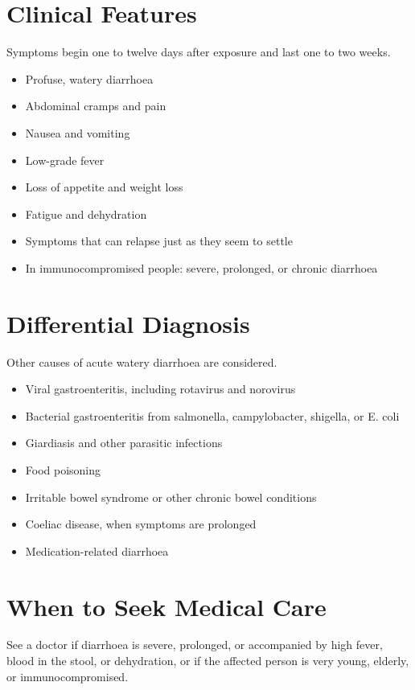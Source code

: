 \section*{Clinical Features}
Symptoms begin one to twelve days after exposure and last one to two weeks.

\begin{itemize}
    \item Profuse, watery diarrhoea
    \item Abdominal cramps and pain
    \item Nausea and vomiting
    \item Low-grade fever
    \item Loss of appetite and weight loss
    \item Fatigue and dehydration
    \item Symptoms that can relapse just as they seem to settle
    \item In immunocompromised people: severe, prolonged, or chronic diarrhoea
\end{itemize}

\section*{Differential Diagnosis}
Other causes of acute watery diarrhoea are considered.

\begin{itemize}
    \item Viral gastroenteritis, including rotavirus and norovirus
    \item Bacterial gastroenteritis from salmonella, campylobacter, shigella, or E. coli
    \item Giardiasis and other parasitic infections
    \item Food poisoning
    \item Irritable bowel syndrome or other chronic bowel conditions
    \item Coeliac disease, when symptoms are prolonged
    \item Medication-related diarrhoea
\end{itemize}

\section*{When to Seek Medical Care}
See a doctor if diarrhoea is severe, prolonged, or accompanied by high fever, blood in the stool, or dehydration, or if the affected person is very young, elderly, or immunocompromised.

